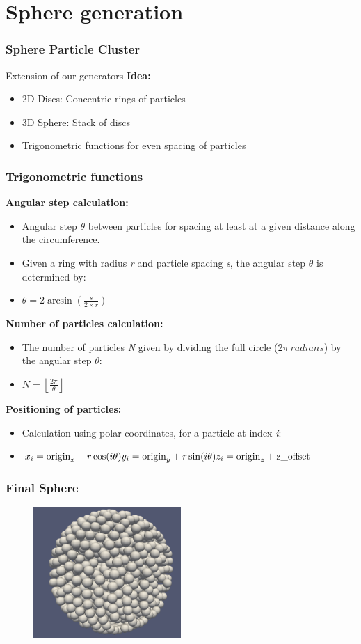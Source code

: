 
\section{Sphere generation}
\label{sec:sphere}

\begin{frame}
    \frametitle{Sphere Particle Cluster}
    Extension of our generators \newline
    \textbf{Idea:}
    \begin{itemize}
        \item 2D Discs: Concentric rings of particles
        \item 3D Sphere: Stack of discs
        \item Trigonometric functions for even spacing of particles
    \end{itemize}
\end{frame}

\begin{frame}
    \frametitle{Trigonometric functions}
    \textbf{Angular step calculation:}
    \begin{itemize}
        \item Angular step $\theta$ between particles for spacing at least at a given distance along the circumference.
        \item Given a ring with radius \textit{r} and particle spacing \textit{s}, the angular step $\theta$ is determined by:
        \item $\theta = 2 \arcsin\left(\frac{s}{2 \times r}\right)$
    \end{itemize}
    \textbf{Number of particles calculation:}
    \begin{itemize}
        \item The number of particles \textit{N} given by dividing the full circle ($2\pi\ radians$) by the angular step $\theta$:
        \item $N = \left\lfloor \frac{2\pi}{\theta} \right\rfloor$
    \end{itemize}
    \textbf{Positioning of particles:}
    \begin{itemize}
        \item Calculation using polar coordinates, for a particle at index \textit{i}:
        \item $x_i = \text{origin}_x + r \cos(i \theta)\newline y_i = \text{origin}_y + r \sin(i \theta)\newline z_i = \text{origin}_z + \text{z\_offset}$
    \end{itemize}
\end{frame}

\begin{frame}
    \frametitle{Final Sphere}
    \begin{figure}
        \label{fig:sphere}
        \includegraphics[width=0.5\textwidth]{res/sphere}
    \end{figure}
\end{frame}
